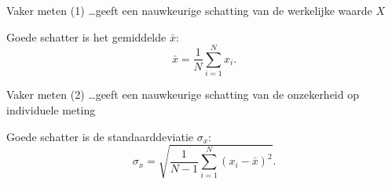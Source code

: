 \documentclass{beamer}
\begin{document}
\begin{frame}{Vaker meten (1)}
  \dots geeft een nauwkeurige schatting van de werkelijke waarde $X$
  \begin{center}
  \end{center}
  {Goede schatter is het gemiddelde $\bar x$:
  \begin{equation*}
    \bar x = \frac{1}{N}\sum_{i=1}^{N} x_i.
  \end{equation*}}
\end{frame}

\begin{frame}{Vaker meten (2)}
  \dots geeft een nauwkeurige schatting van de onzekerheid op \alert{individuele} meting
  \begin{center}
  \end{center}
  {Goede schatter is de standaarddeviatie $\sigma_x$:
  \begin{equation*}
    \sigma_x = \sqrt{\frac{1}{N-1}\sum_{i=1}^{N}(x_i - \bar x)^2}.
  \end{equation*}}
\end{frame}
\end{document}
